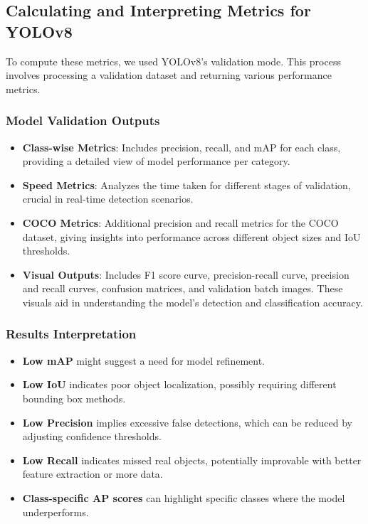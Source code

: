 \documentclass[10pt]{extarticle}
\begin{document}
\subsection{Calculating and Interpreting Metrics for YOLOv8}
To compute these metrics, we used YOLOv8's validation mode. This process involves processing a validation dataset and returning various performance metrics.

\subsubsection{Model Validation Outputs}
\begin{itemize}
    \item \textbf{Class-wise Metrics}: Includes precision, recall, and mAP for each class, providing a detailed view of model performance per category.
    \item \textbf{Speed Metrics}: Analyzes the time taken for different stages of validation, crucial in real-time detection scenarios.
    \item \textbf{COCO Metrics}: Additional precision and recall metrics for the COCO dataset, giving insights into performance across different object sizes and IoU thresholds.
    \item \textbf{Visual Outputs}: Includes F1 score curve, precision-recall curve, precision and recall curves, confusion matrices, and validation batch images. These visuals aid in understanding the model's detection and classification accuracy.
\end{itemize}

\subsubsection{Results Interpretation}
\begin{itemize}
    \item \textbf{Low mAP} might suggest a need for model refinement.
    \item \textbf{Low IoU} indicates poor object localization, possibly requiring different bounding box methods.
    \item \textbf{Low Precision} implies excessive false detections, which can be reduced by adjusting confidence thresholds.
    \item \textbf{Low Recall} indicates missed real objects, potentially improvable with better feature extraction or more data.
    \item \textbf{Class-specific AP scores} can highlight specific classes where the model underperforms.
\end{itemize}
\end{document}
